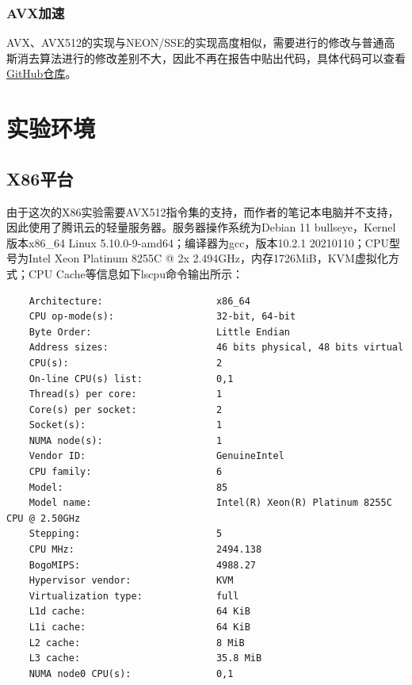 \documentclass[a4paper]{article}
\begin{document}
\subsubsection{AVX加速}
AVX、AVX512的实现与NEON/SSE的实现高度相似，需要进行的修改与普通高斯消去算法进行的修改差别不大，因此不再在报告中贴出代码，具体代码可以查看\href{https://github.com/suhipek/NKU_parallel_programming/tree/main/3_simd}{GitHub仓库}。

\section{实验环境}
\subsection{X86平台}
由于这次的X86实验需要AVX512指令集的支持，而作者的笔记本电脑并不支持，因此使用了腾讯云的轻量服务器。服务器操作系统为Debian 11 bullseye，Kernel版本x86\_64 Linux 5.10.0-9-amd64；编译器为gcc，版本10.2.1 20210110；CPU型号为Intel Xeon Platinum 8255C @ 2x 2.494GHz，内存1726MiB，KVM虚拟化方式；CPU Cache等信息如下lscpu命令输出所示：

\begin{verbatim}
    Architecture:                    x86_64
    CPU op-mode(s):                  32-bit, 64-bit
    Byte Order:                      Little Endian
    Address sizes:                   46 bits physical, 48 bits virtual
    CPU(s):                          2
    On-line CPU(s) list:             0,1
    Thread(s) per core:              1
    Core(s) per socket:              2
    Socket(s):                       1
    NUMA node(s):                    1
    Vendor ID:                       GenuineIntel
    CPU family:                      6
    Model:                           85
    Model name:                      Intel(R) Xeon(R) Platinum 8255C CPU @ 2.50GHz
    Stepping:                        5
    CPU MHz:                         2494.138
    BogoMIPS:                        4988.27
    Hypervisor vendor:               KVM
    Virtualization type:             full
    L1d cache:                       64 KiB
    L1i cache:                       64 KiB
    L2 cache:                        8 MiB
    L3 cache:                        35.8 MiB
    NUMA node0 CPU(s):               0,1
\end{verbatim}
\end{document}
